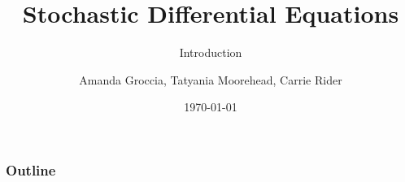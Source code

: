 \documentclass{beamer} %
\begin{document}
\author{Amanda Groccia, Tatyania Moorehead, Carrie Rider}



\title{Stochastic Differential Equations}
\subtitle{Introduction}
\date{\today}

\begin{frame}
  \titlepage
\end{frame}


\begin{frame}
  \frametitle{Outline}
  \tableofcontents[hideallsubsections]
\end{frame}











\end{document}
